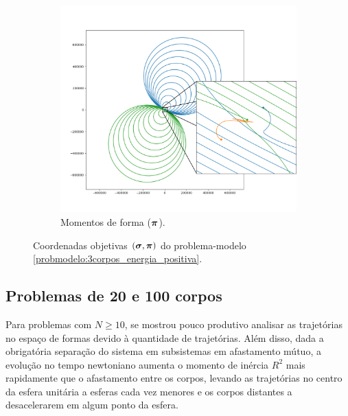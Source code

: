 \begin{figure}[H]
\begin{subfigure}{.5\textwidth}
        \includegraphics[width=\linewidth]{tcc//img/3corpos_energiapositiva_velocidades_sd_zoom.png}
        \caption{Momentos de forma ($\bm \pi$).}
        \label{fig:3corpos_energiapositiva_velocidades_sd}
    \end{subfigure}
    \caption{Coordenadas objetivas $(\bm \sigma, \bm \pi)$ do problema-modelo \ref{probmodelo:3corpos_energia_positiva}.}
    \label{fig:probmodelo3corposenergiapositiva_sd}
\end{figure}




\subsection{Problemas de 20 e 100 corpos}

Para problemas com $N \geq 10$, se mostrou pouco produtivo analisar as trajetórias no espaço de formas devido à quantidade de trajetórias. Além disso, dada a obrigatória separação do sistema em subsistemas em afastamento mútuo, a evolução no tempo newtoniano aumenta o momento de inércia $R^2$ mais rapidamente que o afastamento entre os corpos, levando as trajetórias no centro da esfera unitária a esferas cada vez menores e os corpos distantes a desacelerarem em algum ponto da esfera. 

